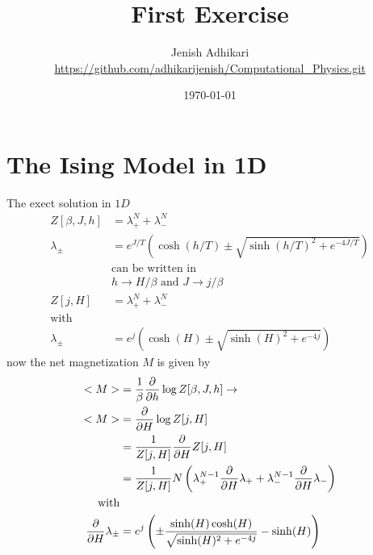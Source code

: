 \documentclass[titlepage]{scrartcl}
\title{First Exercise}
\author{Jenish Adhikari \\ \url{https://github.com/adhikarijenish/Computational_Physics.git}}
\date{\today}
\begin{document}
\maketitle
\tableofcontents
\clearpage
\newpage
{}
\section{The Ising Model in 1D}
The exect solution in $1D$
\begin{align*}
    Z[\beta,J,h] &= \lambda_+^N + \lambda_-^N \\
    \lambda_{\pm} &= e^{J/T}\left( \cosh(h/T)\pm \sqrt{\sinh(h/T)^2+ e^{-4J/T}}\right)\\
    &\text{can be written in}\\
    & h \to H/\beta \text{ and } J \to j/\beta\\
    Z[j,H] &= \lambda_+^N + \lambda_-^N \\ \text{with} \\
    \lambda_{\pm} &= e^{j}\left( \cosh(H)\pm \sqrt{\sinh(H)^2+ e^{-4j}}\right)
\end{align*}
now the net magnetization $M$ is given by
\begin{align*}
    <M> &= \frac{1}{\beta}\diffp*{\log Z[\beta,J,h]}{h} \to \\
    <M> &= \diffp*{\log Z[j,H]}{H}\\
    &= \frac{1}{Z[j,H]} \diffp*{ Z[j,H]}{H}\\
    &= \frac{1}{Z[j,H]} N \left( \lambda_+^{N-1} \diffp*{\lambda_+}{H}
    + \lambda_-^{N-1} \diffp*{\lambda_-}{H} \right) \\
    \text{with}      \\
    \diffp*{\lambda_\pm}{H} &= e^j \left(\pm \frac{\sinh(H)\cosh(H)}
    {\sqrt{\sinh(H)^2 + e^{-4j}}} -\sinh(H)\right)
\end{align*}
\end{document}

